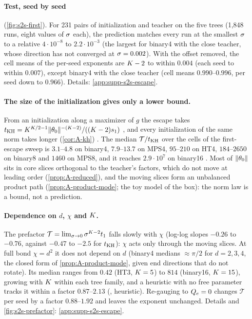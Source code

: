 \paragraph{Test, seed by seed} (\cref{fig:s2s-first}).
\empirical{} For 231 pairs of initialization and teacher on the five trees (1,848 runs, eight values of $\sigma$
each), the prediction matches every run at the smallest $\sigma$ to a relative $4\cdot10^{-8}$ to $2.2\cdot10^{-3}$
(the largest for binary4 with the close teacher, whose direction has not converged at $\sigma=0.002$). With the
offset removed, the cell means of the per-seed exponents are $K-2$ to within $0.004$ (each seed to within
$0.007$), except binary4 with the close teacher (cell means $0.990$--$0.996$, per seed down to $0.966$).
Details: \cref{app:supp-s2s-escape}.

\paragraph{The size of the initialization gives only a lower bound.}
From an initialization along a maximizer of $g$ the escape takes
$t_{\rm KH}=K^{K/2-1}\lVert\theta_0\rVert^{-(K-2)}/((K-2)s_{1})$ , and every initialization of the same norm takes longer (\cref{cor:A-kh}) \proven. The median
$\mathcal{T}/t_{\rm KH}$ over the cells of the first-escape sweep is $3.1$--$4.8$ on binary4, $7.9$--$13.7$ on MPS4, $95$--$210$
on HT4, $184$--$2650$ on binary8 and $1460$ on MPS8, and it reaches $2.9\cdot10^7$ on binary16 \empirical{}
. Most of $\lVert\theta_0\rVert$ sits in core slices orthogonal to the
teacher's factors, which do not move at leading order (\cref{prop:A-reduced}), and the moving slices form an
unbalanced product path (\cref{prop:A-product-mode}; the toy model of the box): the norm law is a bound, not a
prediction.

\paragraph{Dependence on $d$, $\chi$ and $K$.}
\empirical{} The prefactor $\mathcal{T}=\lim_{\sigma\to0}\sigma^{K-2}t_{1}$ falls slowly with $\chi$ (log-log slopes $-0.26$
to $-0.76$, against $-0.47$ to $-2.5$ for $t_{\rm KH}$): $\chi$ acts only through the moving slices. At full bond
$\chi=d^2$ it does not depend on $d$ (binary4 medians $\approx\pi/2$ for $d=2,3,4$, the closed form of
\cref{prop:A-product-mode}, \derived{} given end directions that do not rotate). Its median ranges from $0.42$
(HT3, $K=5$) to $814$ (binary16, $K=15$), growing with $K$ within each tree family, and a heuristic with no
free parameter tracks it within a factor $0.87$--$2.13$ (\conjecture, heuristic). Re-gauging to $Q_{e}=0$ changes
$\mathcal{T}$ per seed by a factor $0.88$--$1.92$ and leaves the exponent unchanged. Details and
\cref{fig:s2s-prefactor}: \cref{app:supp-s2s-escape}. \newresult

